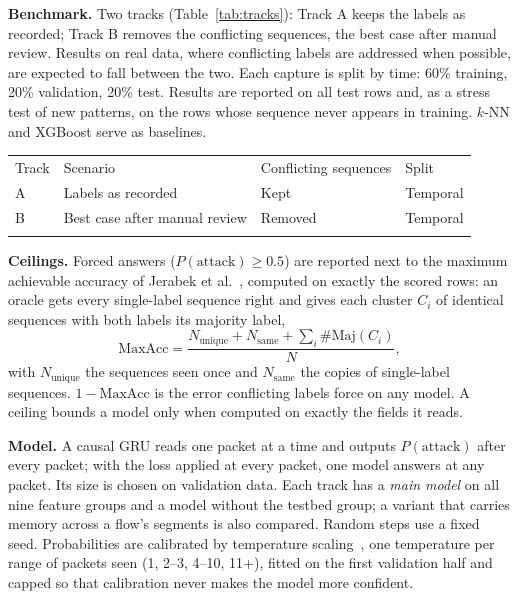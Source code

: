 \documentclass[11pt]{article}
\makeatletter
\newcommand{\toprule}{\noalign{\hrule height 0.8pt\vskip 3pt}}
\newcommand{\midrule}{\noalign{\vskip 2pt\hrule height 0.4pt\vskip 3pt}}
\newcommand{\bottomrule}{\noalign{\vskip 2pt\hrule height 0.8pt}}
\newenvironment{ptable}{\par\medskip\noindent\begin{minipage}{\linewidth}\centering\def\@captype{table}}{\end{minipage}\par\medskip}
\makeatother
\begin{document}
\textbf{Benchmark.} Two tracks (Table~\ref{tab:tracks}): Track A keeps the labels as recorded; Track B removes the
conflicting sequences, the best case after manual review. Results on real data, where conflicting labels are addressed
when possible, are expected to fall between the two. Each capture is split by time: 60\% training, 20\% validation,
20\% test. Results are reported on all test rows and, as a stress test of new patterns, on the rows whose sequence never
appears in training. $k$-NN and XGBoost serve as baselines.

\begin{ptable}
\small
\begin{tabular}{@{}llll@{}}
\toprule
Track & Scenario & Conflicting sequences & Split \\
\midrule
A & Labels as recorded & Kept & Temporal \\
B & Best case after manual review & Removed & Temporal \\
\bottomrule
\end{tabular}
\caption{The two benchmark tracks. The number of segments removed in Track B is reported.}\label{tab:tracks}
\end{ptable}

\textbf{Ceilings.} Forced answers ($P(\text{attack})\ge0.5$) are reported next to the maximum achievable accuracy of
Jerabek et al.~\cite{jerabek}, computed on exactly the scored rows: an oracle gets every single-label sequence right and
gives each cluster $C_i$ of identical sequences with both labels its majority label,
\begin{equation}
\mathrm{MaxAcc} = \frac{N_{\mathrm{unique}} + N_{\mathrm{same}} + \sum_i \#\mathrm{Maj}(C_i)}{N},
\end{equation}
with $N_{\mathrm{unique}}$ the sequences seen once and $N_{\mathrm{same}}$ the copies of single-label sequences. $1 -
\mathrm{MaxAcc}$ is the error conflicting labels force on any model. A ceiling
bounds a model only when computed on exactly the fields it reads.

\textbf{Model.} A causal GRU reads one packet at a time and outputs $P(\text{attack})$ after every packet; with the loss
applied at every packet, one model answers at any packet. Its size is chosen on validation data. Each track has a
\emph{main model} on all nine feature groups and a model without the testbed group; a variant that carries memory
across a flow's segments is also compared. Random steps use a fixed seed. Probabilities are calibrated by temperature
scaling~\cite{guo}, one temperature per range of packets seen (1, 2--3, 4--10, 11+), fitted on the first validation
half and capped so that calibration never makes the model more confident.
\end{document}
